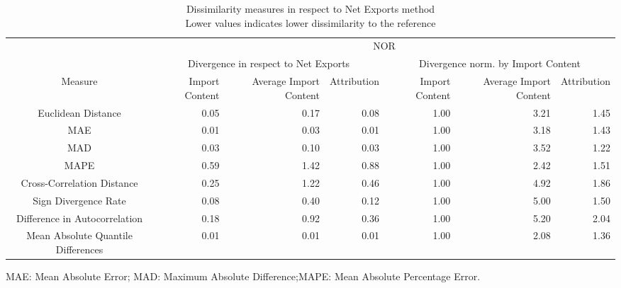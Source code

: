 \begin{table}[t]
\caption*{
{\large Dissimilarity measures in respect to Net Exports method} \\ 
{\small Lower values indicates lower dissimilarity to the reference}
} 
\fontsize{15.0pt}{18.0pt}\selectfont
\begin{tabular*}{\linewidth}{@{\extracolsep{\fill}}crrrrrr}
\toprule
 & \multicolumn{6}{c}{NOR} \\ 
\cmidrule(lr){2-7}
 & \multicolumn{3}{c}{Divergence in respect to Net Exports} & \multicolumn{3}{c}{Divergence norm. by Import Content} \\ 
\cmidrule(lr){2-4} \cmidrule(lr){5-7}
Measure & Import Content & Average Import Content & Attribution & Import Content & Average Import Content & Attribution \\ 
\midrule\addlinespace[2.5pt]
Euclidean Distance & 0.05 & 0.17 & 0.08 & 1.00 & 3.21 & 1.45 \\ 
MAE & 0.01 & 0.03 & 0.01 & 1.00 & 3.18 & 1.43 \\ 
MAD & 0.03 & 0.10 & 0.03 & 1.00 & 3.52 & 1.22 \\ 
MAPE & 0.59 & 1.42 & 0.88 & 1.00 & 2.42 & 1.51 \\ 
Cross-Correlation Distance & 0.25 & 1.22 & 0.46 & 1.00 & 4.92 & 1.86 \\ 
Sign Divergence Rate & 0.08 & 0.40 & 0.12 & 1.00 & 5.00 & 1.50 \\ 
Difference in Autocorrelation & 0.18 & 0.92 & 0.36 & 1.00 & 5.20 & 2.04 \\ 
Mean Absolute Quantile Differences & 0.01 & 0.01 & 0.01 & 1.00 & 2.08 & 1.36 \\ 
\bottomrule
\end{tabular*}
\begin{minipage}{\linewidth}
MAE: Mean Absolute Error; MAD: Maximum Absolute Difference;MAPE: Mean Absolute Percentage Error.\\
\end{minipage}
\end{table}

